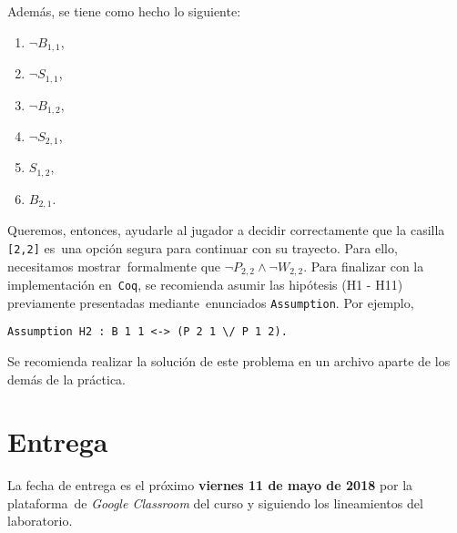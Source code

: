 \documentclass[paper=letter, fontsize=12pt]{scrartcl}
\begin{document}
Además, se tiene como hecho lo siguiente:
\begin{enumerate}[label=H\arabic*, resume]
\item $\neg B_{1,1}$,
\item $\neg S_{1,1}$,
\item $\neg B_{1,2}$,
\item $\neg S_{2,1}$,
\item $S_{1,2}$,
\item $B_{2,1}$.
\end{enumerate}
Queremos, entonces, ayudarle al jugador a decidir correctamente que la casilla \verb+[2,2]+ es\
una opción segura para continuar con su trayecto. Para ello, necesitamos mostrar\
formalmente que $\neg P_{2,2} \wedge \neg W_{2,2}$. Para finalizar con la implementación en\
\verb+Coq+, se recomienda asumir las hipótesis (H1 - H11) previamente presentadas mediante\
enunciados \verb+Assumption+. Por ejemplo,
\begin{verbatim}
Assumption H2 : B 1 1 <-> (P 2 1 \/ P 1 2).
\end{verbatim}\par
Se recomienda realizar la solución de este problema en un archivo aparte de los demás de la práctica.

\section{Entrega}

\noindent
La fecha de entrega es el próximo \textbf{viernes 11 de mayo de 2018} por la plataforma\
de \emph{Google Classroom} del curso y siguiendo los lineamientos del laboratorio.
\end{document}
